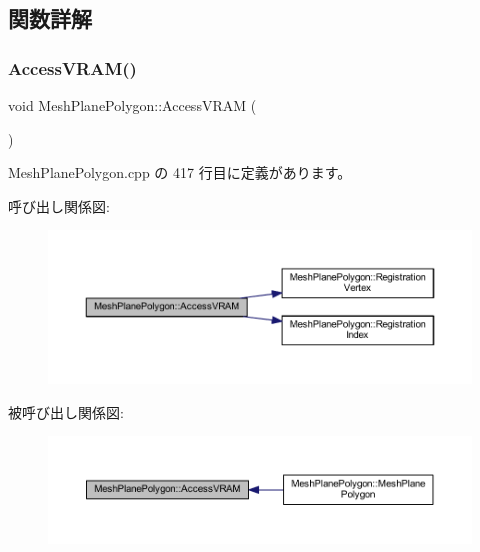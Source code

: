 \subsection{関数詳解}
\mbox{\label{class_mesh_plane_polygon_a30fd785154d01644ba76165673c5a7ac}} 
\subsubsection{\texorpdfstring{Access\+V\+R\+A\+M()}{AccessVRAM()}}
{\footnotesize\ttfamily void Mesh\+Plane\+Polygon\+::\+Access\+V\+R\+AM (\begin{DoxyParamCaption}{ }\end{DoxyParamCaption})\hspace{0.3cm}{\ttfamily [private]}}



 Mesh\+Plane\+Polygon.\+cpp の 417 行目に定義があります。

呼び出し関係図\+:\nopagebreak
\begin{figure}[H]
\begin{center}
\leavevmode
\includegraphics[width=350pt]{class_mesh_plane_polygon_a30fd785154d01644ba76165673c5a7ac_cgraph}
\end{center}
\end{figure}
被呼び出し関係図\+:\nopagebreak
\begin{figure}[H]
\begin{center}
\leavevmode
\includegraphics[width=350pt]{class_mesh_plane_polygon_a30fd785154d01644ba76165673c5a7ac_icgraph}
\end{center}
\end{figure}
\mbox{\label{class_mesh_plane_polygon_a815092659c44ccd2f626445c7dd95c9e}} 
